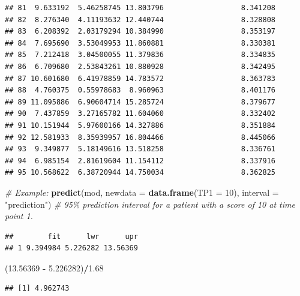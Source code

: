 \documentclass[
]{book}
\newenvironment{Shaded}{\begin{snugshade}}{\end{snugshade}}
\newcommand{\AttributeTok}[1]{\textcolor[rgb]{0.13,0.29,0.53}{#1}}
\newcommand{\CommentTok}[1]{\textcolor[rgb]{0.56,0.35,0.01}{\textit{#1}}}
\newcommand{\DecValTok}[1]{\textcolor[rgb]{0.00,0.00,0.81}{#1}}
\newcommand{\FloatTok}[1]{\textcolor[rgb]{0.00,0.00,0.81}{#1}}
\newcommand{\FunctionTok}[1]{\textcolor[rgb]{0.13,0.29,0.53}{\textbf{#1}}}
\newcommand{\NormalTok}[1]{#1}
\newcommand{\SpecialCharTok}[1]{\textcolor[rgb]{0.81,0.36,0.00}{\textbf{#1}}}
\newcommand{\StringTok}[1]{\textcolor[rgb]{0.31,0.60,0.02}{#1}}
\begin{document}
\begin{verbatim}
## 81  9.633192  5.46258745 13.803796                  8.341208
## 82  8.276340  4.11193632 12.440744                  8.328808
## 83  6.208392  2.03179294 10.384990                  8.353197
## 84  7.695690  3.53049953 11.860881                  8.330381
## 85  7.212418  3.04500055 11.379836                  8.334835
## 86  6.709680  2.53843261 10.880928                  8.342495
## 87 10.601680  6.41978859 14.783572                  8.363783
## 88  4.760375  0.55978683  8.960963                  8.401176
## 89 11.095886  6.90604714 15.285724                  8.379677
## 90  7.437859  3.27165782 11.604060                  8.332402
## 91 10.151944  5.97600166 14.327886                  8.351884
## 92 12.581933  8.35939957 16.804466                  8.445066
## 93  9.349877  5.18149616 13.518258                  8.336761
## 94  6.985154  2.81619604 11.154112                  8.337916
## 95 10.568622  6.38720944 14.750034                  8.362825
\end{verbatim}

\begin{Shaded}
\begin{Highlighting}[]
\CommentTok{\# Example:}
\FunctionTok{predict}\NormalTok{(mod, }\AttributeTok{newdata =} \FunctionTok{data.frame}\NormalTok{(}\AttributeTok{TP1 =} \DecValTok{10}\NormalTok{), }\AttributeTok{interval =} \StringTok{"prediction"}\NormalTok{) }\CommentTok{\# 95\% prediction interval for a patient with a score of 10 at time point 1.}
\end{Highlighting}
\end{Shaded}

\begin{verbatim}
##        fit      lwr      upr
## 1 9.394984 5.226282 13.56369
\end{verbatim}

\begin{Shaded}
\begin{Highlighting}[]
\NormalTok{(}\FloatTok{13.56369} \SpecialCharTok{{-}} \FloatTok{5.226282}\NormalTok{)}\SpecialCharTok{/}\FloatTok{1.68}
\end{Highlighting}
\end{Shaded}

\begin{verbatim}
## [1] 4.962743
\end{verbatim}
\end{document}
